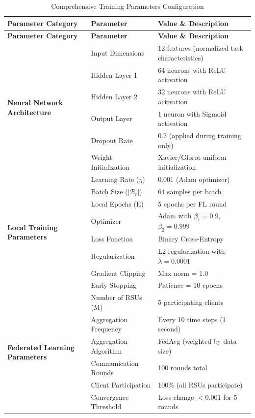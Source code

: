 \documentclass[11pt]{article}
\begin{document}
\begin{longtable}{|p{4cm}|p{3cm}|p{8cm}|}
\caption{Comprehensive Training Parameters Configuration} \\
\hline
\textbf{Parameter Category} & \textbf{Parameter} & \textbf{Value \& Description} \\
\hline
\endfirsthead
\hline
\textbf{Parameter Category} & \textbf{Parameter} & \textbf{Value \& Description} \\
\hline
\endhead

\multirow{6}{*}{\textbf{Neural Network Architecture}} 
& Input Dimensions & 12 features (normalized task characteristics) \\
\cline{2-3}
& Hidden Layer 1 & 64 neurons with ReLU activation \\
\cline{2-3}
& Hidden Layer 2 & 32 neurons with ReLU activation \\
\cline{2-3}
& Output Layer & 1 neuron with Sigmoid activation \\
\cline{2-3}
& Dropout Rate & 0.2 (applied during training only) \\
\cline{2-3}
& Weight Initialization & Xavier/Glorot uniform initialization \\
\hline

\multirow{8}{*}{\textbf{Local Training Parameters}} 
& Learning Rate ($\eta$) & 0.001 (Adam optimizer) \\
\cline{2-3}
& Batch Size ($|\mathcal{B}_r|$) & 64 samples per batch \\
\cline{2-3}
& Local Epochs (E) & 5 epochs per FL round \\
\cline{2-3}
& Optimizer & Adam with $\beta_1=0.9$, $\beta_2=0.999$ \\
\cline{2-3}
& Loss Function & Binary Cross-Entropy \\
\cline{2-3}
& Regularization & L2 regularization with $\lambda=0.0001$ \\
\cline{2-3}
& Gradient Clipping & Max norm = 1.0 \\
\cline{2-3}
& Early Stopping & Patience = 10 epochs \\
\hline

\multirow{6}{*}{\textbf{Federated Learning Parameters}} 
& Number of RSUs (M) & 5 participating clients \\
\cline{2-3}
& Aggregation Frequency & Every 10 time steps (1 second) \\
\cline{2-3}
& Aggregation Algorithm & FedAvg (weighted by data size) \\
\cline{2-3}
& Communication Rounds & 100 rounds total \\
\cline{2-3}
& Client Participation & 100\% (all RSUs participate) \\
\cline{2-3}
& Convergence Threshold & Loss change $< 0.001$ for 5 rounds \\
\hline


\end{longtable}
\end{document}
